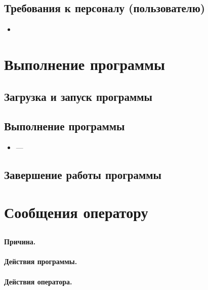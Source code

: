 \documentclass[allcolors=black]{article}
\begin{document}
\subsection{Требования к персоналу (пользователю)}
\begin{itemize}
    \item {}
\end{itemize}

\section{Выполнение программы}
\subsection{Загрузка и запуск программы}

\subsection{Выполнение программы}
\begin{itemize}
    \item \textit{} --- 
\end{itemize}
    
\subsection{Завершение работы программы}
    
\section{Сообщения  оператору}
\subsection{}
\paragraph{Причина. } 
\paragraph{Действия программы. } 
\paragraph{Действия оператора. } 
\end{document}
